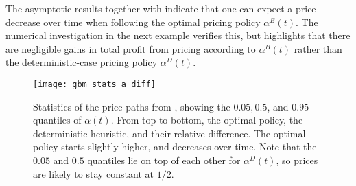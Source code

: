 \documentclass[main.tex]{subfiles}
\begin{document}
The asymptotic results together with  indicate that one can expect a price
decrease over time when following the optimal pricing policy
$\alpha^B(t)$.
The numerical investigation in the next example verifies this, but highlights
that there are negligible gains in total profit from pricing according to
$\alpha^B(t)$ rather than the deterministic-case
pricing policy $\alpha^D(t)$.

\begin{figure}[htb]
  \centering
  \texttt{[image: gbm\_stats\_a\_diff]}
  \caption{Statistics of the price paths from
    , %
    showing the $0.05,0.5$, and
    $0.95$ quantiles of $\alpha(t)$. From top to bottom, the optimal
    policy, the deterministic heuristic, and their relative difference.
    The optimal policy starts slightly higher, and decreases over
    time.
    Note that the $0.05$ and $0.5$ quantiles lie on top of each
    other for $\alpha^D(t)$, so prices are likely to stay constant
    at $1/2$.
  }\label{fig:gbm_stats_a}
\end{figure}
\end{document}
